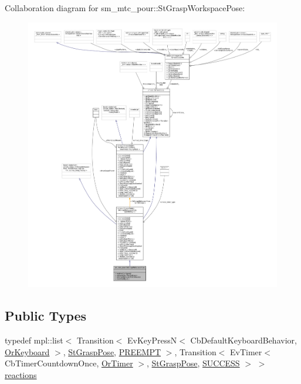 Collaboration diagram for sm\+\_\+mtc\+\_\+pour\+:\+:St\+Grasp\+Workspace\+Pose\+:
\nopagebreak
\begin{figure}[H]
\begin{center}
\leavevmode
\includegraphics[width=350pt]{structsm__mtc__pour_1_1StGraspWorkspacePose__coll__graph}
\end{center}
\end{figure}
\subsection*{Public Types}
\begin{DoxyCompactItemize}
\item 
typedef mpl\+::list$<$ Transition$<$ Ev\+Key\+PressN$<$ Cb\+Default\+Keyboard\+Behavior, \hyperlink{classsm__mtc__pour_1_1OrKeyboard}{Or\+Keyboard} $>$, \hyperlink{structsm__mtc__pour_1_1StGraspPose}{St\+Grasp\+Pose}, \hyperlink{classPREEMPT}{P\+R\+E\+E\+M\+PT} $>$, Transition$<$ Ev\+Timer$<$ Cb\+Timer\+Countdown\+Once, \hyperlink{classsm__mtc__pour_1_1OrTimer}{Or\+Timer} $>$, \hyperlink{structsm__mtc__pour_1_1StGraspPose}{St\+Grasp\+Pose}, \hyperlink{classSUCCESS}{S\+U\+C\+C\+E\+SS} $>$ $>$ \hyperlink{structsm__mtc__pour_1_1StGraspWorkspacePose_a3f268472d0bf5bd8f233d25052275c2a}{reactions}
\end{DoxyCompactItemize}
